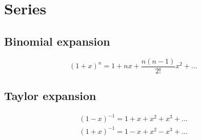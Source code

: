 \label{appendix2.series}

\ifpdf
\graphicspath{{Appendix2/figs/}}
\else
\graphicspath{{Appendix2/figs/}}
\fi

\chapter{Series} 
\section{Binomial expansion}
\begin{equation}
	(1 + x)^n = 1 + n x + \frac{n(n-1)}{2 !} x^2 + \ldots
\end{equation}

\section{Taylor expansion}
\begin{align}
	(1 - x)^{-1} = 1 + x + x^2 + x^3 + \ldots	\\
	(1 + x)^{-1} = 1 - x + x^2 - x^3 + \ldots
\end{align}

